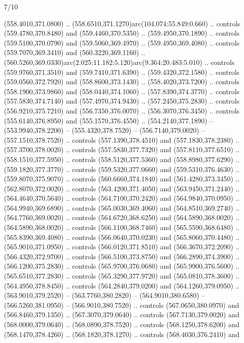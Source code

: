\begin{flagdescription}{7/10}
\begin{scope}[xshift=0.5\flaglength]
\begin{scope}[scale=0.00185\flagwidth,yshift=245mm,xshift=-43.7mm]
\begin{scope}[y=-0.8pt, x=0.8pt, inner sep=0pt, outer sep=0pt]
\begin{scope}[shift={(0,0)},shift={(0,36.591)}]
\begin{scope}[shift={(-344.0678,183.89831)}]
  (558.4010,371.0800) .. (558.6510,371.1270)arc(104.074:55.849:0.660) ..
  controls (559.4780,370.8480) and (559.4460,370.5350) .. (559.4950,370.1890) ..
  controls (559.5100,370.0790) and (559.5060,369.4970) .. (559.4950,369.4080) ..
  controls (559.7070,369.3410) and (560.3220,369.1160) ..
  (560.5260,369.0330)arc(2.025:11.182:5.120)arc(9.364:20.483:5.010) .. controls
  (559.9760,371.3510) and (559.7410,371.6390) .. (559.4320,372.1580) .. controls
  (559.0560,372.7920) and (558.8600,373.1430) .. (558.4020,373.7200) .. controls
  (558.1900,373.9860) and (558.0440,374.1060) .. (557.8390,374.3770) .. controls
  (557.5830,374.7140) and (557.4970,374.9430) .. (557.2450,375.2830) .. controls
  (556.9210,375.7210) and (556.7350,376.0070) .. (556.3070,376.3450) .. controls
  (555.6140,376.8950) and (555.1570,376.4550) .. (554.2140,377.1890) --
  (553.9940,378.2200) -- (555.4320,378.7520) -- (556.7140,379.0020) --
  (557.1510,378.7520) .. controls (557.1390,378.4510) and (557.1830,378.2380) ..
  (557.3700,378.0020) .. controls (557.5830,377.7320) and (557.8110,377.6510) ..
  (558.1510,377.5950) .. controls (558.5120,377.5360) and (558.8980,377.6290) ..
  (559.1820,377.3770) .. controls (559.5320,377.0660) and (559.5310,376.4630) ..
  (559.8070,375.9070) .. controls (560.6660,374.1840) and (561.4280,373.3450) ..
  (562.8070,372.0020) .. controls (563.4200,371.4050) and (563.9450,371.2440) ..
  (564.4640,370.5640) .. controls (564.7100,370.2420) and (564.9840,370.0950) ..
  (564.9940,369.6890) .. controls (565.0030,369.4060) and (564.8510,369.2740) ..
  (564.7760,369.0020) .. controls (564.6720,368.6250) and (564.5890,368.0020) ..
  (564.5890,368.0020) .. controls (566.1100,368.7460) and (565.5590,368.6480) ..
  (565.8390,369.4080) .. controls (566.0640,370.0230) and (565.8060,370.4480) ..
  (565.9010,371.0950) .. controls (566.0120,371.8510) and (566.3670,372.2090) ..
  (566.4320,372.9700) .. controls (566.5100,373.8750) and (566.2890,374.3900) ..
  (566.1200,375.2830) .. controls (565.9700,376.0680) and (565.9900,376.5600) ..
  (565.6510,377.2830) .. controls (565.3290,377.9720) and (565.0810,378.3600) ..
  (564.4950,378.8450) .. controls (564.2840,379.0200) and (564.1260,379.0950) ..
  (563.9010,379.2520) -- (563.7760,380.2820) -- (564.9010,380.6580) --
  (566.5260,381.0950) -- (566.9010,380.7520) .. controls (567.0650,380.0970) and
  (566.8460,379.1350) .. (567.3070,379.0640) .. controls (567.7130,379.0020) and
  (568.0000,379.0640) .. (568.0890,378.7520) .. controls (568.1250,378.6200) and
  (568.1470,378.4260) .. (568.1820,378.1270) .. controls (568.4030,376.2410) and

\end{scope}
\end{scope}
\end{scope}
\end{scope}
\end{scope}
\end{flagdescription}
